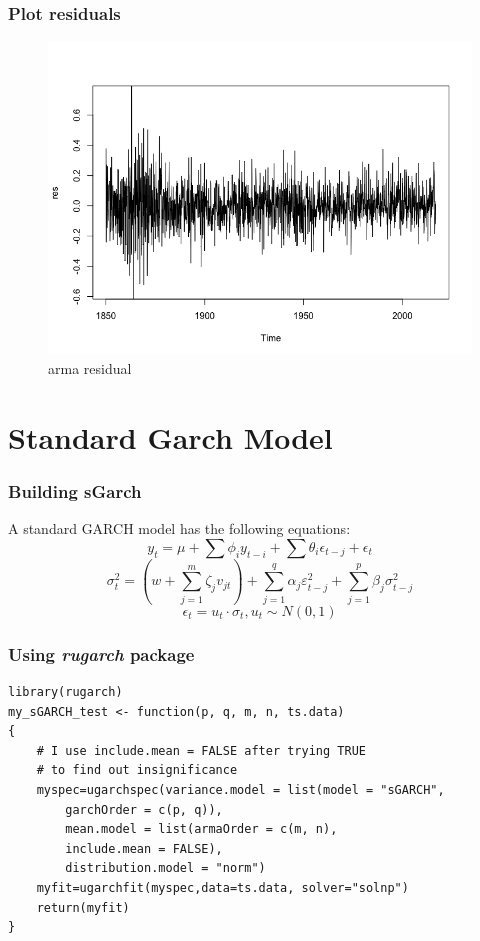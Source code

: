\documentclass[9pt]{beamer}
\begin{document}
\begin{frame}[fragile]
\frametitle{Plot residuals}
\begin{figure}[H]
\centering
\caption{arma residual}
\includegraphics[scale=.40]{armares.png}
\end{figure}
\end{frame}

\section{Standard Garch Model}

\begin{frame}[fragile]
\frametitle{Building sGarch}
A standard GARCH model has the following equations:
\begin{equation*}
y_t = \mu + \sum \phi_i y_{t-i} + \sum \theta_i \epsilon_{t-j} + \epsilon_t 
\end{equation*}
\begin{equation*}
	\sigma_t^2 = (w + \sum_{j = 1}^m \zeta_j v_{jt}) + \sum_{j = 1}^q \alpha_j \varepsilon_{t-j}^2 + \sum_{j = 1}^p \beta_j \sigma_{t-j}^2
\end{equation*} 
\begin{equation*}
\epsilon_t = u_t \cdot \sigma_t, u_t \sim N(0, 1) 
\end{equation*}
\end{frame}

\begin{frame}[fragile]
\frametitle{Using \textit{rugarch} package}
\begin{verbatim}
library(rugarch)
my_sGARCH_test <- function(p, q, m, n, ts.data)
{
	# I use include.mean = FALSE after trying TRUE
	# to find out insignificance
    myspec=ugarchspec(variance.model = list(model = "sGARCH",
    	garchOrder = c(p, q)), 
    	mean.model = list(armaOrder = c(m, n), 
    	include.mean = FALSE), 
    	distribution.model = "norm")
    myfit=ugarchfit(myspec,data=ts.data, solver="solnp")
    return(myfit)  
}
\end{verbatim}
\end{frame}
\end{document}
